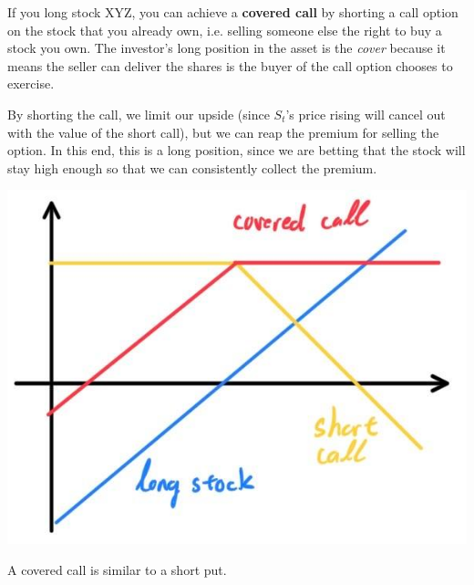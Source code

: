 \documentclass{article}
\begin{document}
    \begin{definition}
      If you long stock XYZ, you can achieve a \textbf{covered call} by shorting a call option on the stock that you already own, i.e. selling someone else the right to buy a stock you own. The investor's long position in the asset is the \textit{cover} because it means the seller can deliver the shares is the buyer of the call option chooses to exercise. 

      By shorting the call, we limit our upside (since $S_t$'s price rising will cancel out with the value of the short call), but we can reap the premium for selling the option. In this end, this is a long position, since we are betting that the stock will stay high enough so that we can consistently collect the premium. 
      \begin{center}
        \includegraphics[scale=0.3]{img/covered_call.jpg}
      \end{center}
      A covered call is similar to a short put. 
    \end{definition}
\end{document}
